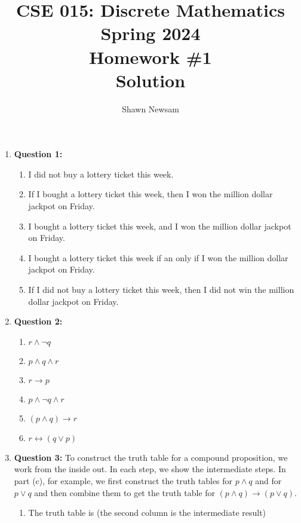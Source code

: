 \documentclass[11pt]{article}
\begin{document}
\author{Shawn Newsam}
\title{CSE 015: Discrete Mathematics\\
Spring 2024\\
Homework \#1\\
Solution}
\date{}
\maketitle
\begin{enumerate}
\item
\textbf{Question 1:}
\begin{enumerate}[label=(\alph*)]
\item I did not buy a lottery ticket this week.
\item If I bought a lottery ticket this week, then I won the million dollar jackpot
on Friday.
\item I bought a lottery ticket this week, and I won the million dollar jackpot on
Friday.
\item I bought a lottery ticket this week if an only if I won the million dollar
jackpot on Friday.
\item If I did not buy a lottery ticket this week, then I did not win the million
dollar jackpot on Friday.
\end{enumerate}
\item
\textbf{Question 2:}
\begin{enumerate}[label=(\alph*)]
\item $r \land \lnot q$
\item $p \land q \land r$
\item $r \rightarrow p$
\item $p \land \lnot q \land r$
\item $(p \land q) \rightarrow r$
\item $r \leftrightarrow (q \lor p)$
\end{enumerate}
\item
\textbf{Question 3:}
To construct the truth table for a compound proposition, we work from the inside
out. In each step, we show the intermediate steps. In part (c), for example, we
first construct the truth tables for $p \land q$ and for $p \lor q$ and then
combine them to get the truth table for $(p \land q) \rightarrow (p \lor q)$.
\begin{enumerate}[label=(\alph*)]
\item
The truth table is (the second column is the intermediate result)
\begin{center}
\begin{tabular}{|c|c|c|}

\end{tabular}
\end{center}
\end{enumerate}
\end{enumerate}
\end{document}
